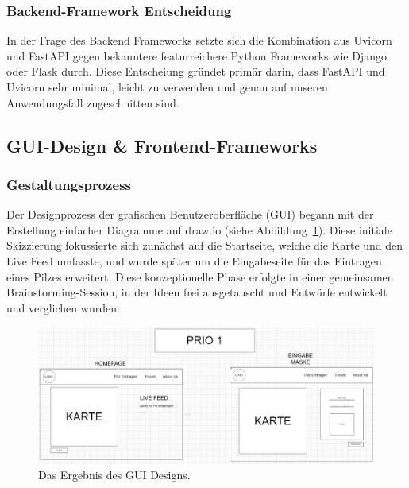 \documentclass[../main.tex]{subfiles}
\begin{document}
\subsubsection{Backend-Framework Entscheidung}

In der Frage des Backend Frameworks setzte sich die Kombination aus Uvicorn und FastAPI gegen bekanntere featurreichere Python Frameworks wie Django oder Flask
durch. Diese Entscheiung gründet primär darin, dass FastAPI und Uvicorn sehr minimal, leicht zu verwenden und genau auf unseren Anwendungsfall zugeschnitten sind.

\subsection{GUI-Design \& Frontend-Frameworks}

\subsubsection{Gestaltungsprozess}

Der Designprozess der grafischen Benutzeroberfläche (GUI) begann mit der Erstellung einfacher Diagramme auf draw.io
(siehe Abbildung~\ref{fig:GUI_Entwurf}). Diese initiale Skizzierung fokussierte sich zunächst auf die Startseite, welche
die Karte und den Live Feed umfasste, und wurde später um die Eingabeseite für das Eintragen eines Pilzes erweitert. Diese
konzeptionelle Phase erfolgte in einer gemeinsamen Brainstorming-Session, in der Ideen frei ausgetauscht und Entwürfe
entwickelt und verglichen wurden.

\begin{figure}[ht]
	\centering
	\includegraphics[width=\textwidth]{abbildungen/GuiEntwurfDrawio.jpg}
	\caption{Das Ergebnis des GUI Designs.}
	\label{fig:GUI_Entwurf}
\end{figure}
\end{document}
